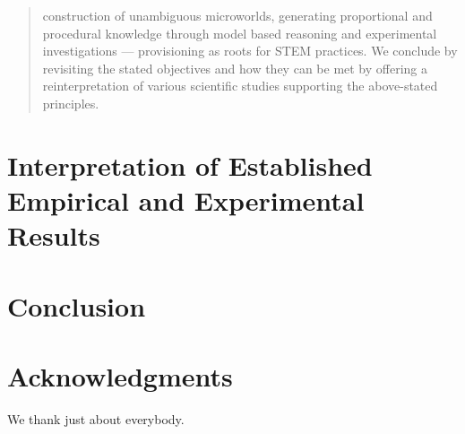 \documentclass[twoside, nobib]{tufte-handout}
\begin{document}
\begin{abstract}
construction of unambiguous microworlds, generating proportional and procedural knowledge through model based reasoning and experimental investigations --- provisioning as roots for STEM practices. We conclude by revisiting the stated objectives and how they can be met by offering a reinterpretation of various scientific studies supporting the above-stated principles.

\end{abstract}








\section{Interpretation of Established Empirical and Experimental Results}

\section{Conclusion}

\section*{Acknowledgments}
We thank just about everybody.

\nolinenumbers


%
\end{document}
